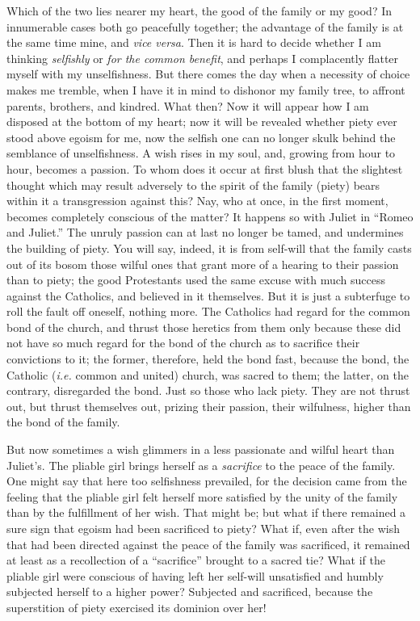 Which of the two lies nearer my heart, the good of the family or my good? In 
innumerable cases both go peacefully together; the advantage of the family is 
at the same time mine, and \textit{vice versa}. Then it is hard to decide 
whether I am thinking \textit{selfishly} or \textit{for the common benefit}, 
and perhaps I complacently flatter myself with my unselfishness. But there 
comes the day when a necessity of choice makes me tremble, when I have it in 
mind to dishonor my family tree, to affront parents, brothers, and kindred. 
What then? Now it will appear how I am disposed at the bottom of my heart; now 
it will be revealed whether piety ever stood above egoism for me, now the 
selfish one can no longer skulk behind the semblance of unselfishness. A wish 
rises in my soul, and, growing from hour to hour, becomes a passion. To whom 
does it occur at first blush that the slightest thought which may result 
adversely to the spirit of the family (piety) bears within it a transgression 
against this? Nay, who at once, in the first moment, becomes completely 
conscious of the matter? It happens so with Juliet in ``Romeo and Juliet.'' 
The unruly passion can at last no longer be tamed, and undermines the building 
of piety. You will say, indeed, it is from self-will that the family casts out 
of its bosom those wilful ones that grant more of a hearing to their passion 
than to piety; the good Protestants used the same excuse with much success 
against the Catholics, and believed in it themselves. But it is just a 
subterfuge to roll the fault off oneself, nothing more. The Catholics had 
regard for the common bond of the church, and thrust those heretics from them 
only because these did not have so much regard for the bond of the church as 
to sacrifice their convictions to it; the former, therefore, held the bond 
fast, because the bond, the Catholic (\textit{i.e.} common and united) church, 
was sacred to them; the latter, on the contrary, disregarded the bond. Just so 
those who lack piety. They are not thrust out, but thrust themselves out, 
prizing their passion, their wilfulness, higher than the bond of the family.

But now sometimes a wish glimmers in a less passionate and wilful heart than 
Juliet's. The pliable girl brings herself as a \textit{sacrifice} to the peace 
of the family. One might say that here too selfishness prevailed, for the 
decision came from the feeling that the pliable girl felt herself more 
satisfied by the unity of the family than by the fulfillment of her wish. That 
might be; but what if there remained a sure sign that egoism had been 
sacrificed to piety? What if, even after the wish that had been directed 
against the peace of the family was sacrificed, it remained at least as a 
recollection of a ``sacrifice'' brought to a sacred tie? What if the pliable 
girl were conscious of having left her self-will unsatisfied and humbly 
subjected herself to a higher power? Subjected and sacrificed, because the 
superstition of piety exercised its dominion over her!


